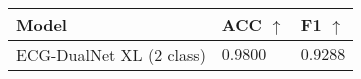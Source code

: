 \begin{tabular}{>{\raggedright\arraybackslash}p{}>{\raggedright\arraybackslash}p{}>{\raggedright\arraybackslash}p{}}
    \hline
	Model & ACC $\uparrow$ & F1 $\uparrow$ \\
	\hline
	ECG-DualNet XL ($2$ class) & $0.9800$ & $0.9288$ \\
	\hline
\end{tabular}
